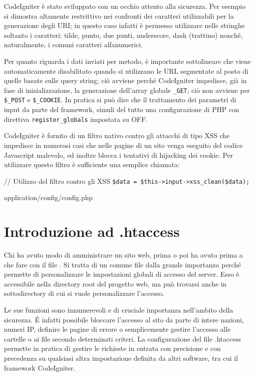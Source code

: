CodeIgniter è stato sviluppato con un occhio attento alla sicurezza. Per esempio si dimostra altamente restrittivo nei confronti dei caratteri utilizzabili per la generazione degli \ac{URI}; in questo caso infatti è permesso utilizzare nelle stringhe soltanto i caratteri: tilde, punto, due punti, underscore, dash (trattino) nonché, naturalmente, i comuni caratteri alfanumerici.

Per quanto riguarda i dati inviati per metodo, è importante sottolineare che  viene automaticamente disabilitato quando si utilizzano le \ac{URL} segmentate al posto di quelle basate sulle query string; ciò avviene perché CodeIgniter impedisce, già in fase di inizializzazione, la generazione dell'array globale \verb|_GET|; ciò non avviene per \verb|$_POST| e \verb|$_COOKIE|. In pratica si può dire che il trattamento dei parametri di input da parte del framework, simuli del tutto una configurazione di \ac{PHP} con direttiva \verb|register_globals| impostata su OFF.

CodeIgniter è fornito di un filtro nativo contro gli attacchi di tipo \ac{XSS} che impedisce in numerosi casi che nelle pagine di un sito venga eseguito del codice Javascript malevolo, ed inoltre blocca i tentativi di hijacking dei cookie. Per utilizzare questo filtro è sufficiente una semplice chiamata:

\begin{code}
// Utilizzo del filtro contro gli XSS
\verb|$data = $this->input->xss_clean($data);|
\end{code}

\begin{code}
application/config/config.php
\end{code}

\section*{Introduzione ad .htaccess}
Chi ha avuto modo di amministrare un sito web, prima o poi ha avuto prima a che fare con il file . Si tratta di un comune file dalla grande importanza perché permette di personalizzare le impostazioni globali di accesso del server. Esso è accessibile nella directory root del progetto web, ma può trovarsi anche in sottodirectory di cui si vuole personalizzare l'accesso.

Le sue funzioni sono innumerevoli e di cruciale importanza nell'ambito della sicurezza. \'E infatti possibile bloccare l'accesso al sito da parte di intere nazioni, numeri IP, definire le pagine di errore o semplicemente gestire l'accesso alle cartelle o ai file secondo determinati criteri. La configurazione del file .htaccess permette in pratica di gestire le richieste in entrata con precisione e con precedenza su qualsiasi altra impostazione definita da altri software, tra cui il framework CodeIgniter.

